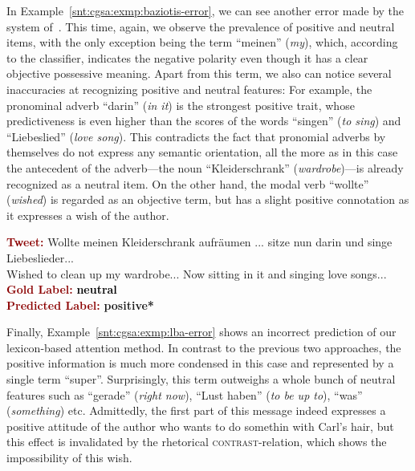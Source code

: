 In Example~\ref{snt:cgsa:exmp:baziotis-error}, we can see another
error made by the system of~\citet{Baziotis:17}.  This time, again, we
observe the prevalence of positive and neutral items, with the only
exception being the term ``meinen'' (\emph{my}), which, according to
the classifier, indicates the negative polarity even though it has a
clear objective possessive meaning.  Apart from this term, we also can
notice several inaccuracies at recognizing positive and neutral
features: For example, the pronominal adverb ``darin'' (\emph{in it})
is the strongest positive trait, whose predictiveness is even higher
than the scores of the words ``singen'' (\emph{to sing}) and
``Liebeslied'' (\emph{love song}).  This contradicts the fact that
pronomial adverbs by themselves do not express any semantic
orientation, all the more as in this case the antecedent of the
adverb---the noun ``Kleiderschrank'' (\emph{wardrobe})---is already
recognized as a neutral item.  On the other hand, the modal verb
``wollte'' (\emph{wished}) is regarded as an objective term, but has a
slight positive connotation as it expresses a wish of the author.

\begin{example}\label{snt:cgsa:exmp:baziotis-error}
  \noindent\textup{\bfseries\textcolor{darkred}{Tweet:}} {\upshape \colorbox{white!1.4}{Wollte} \colorbox{blue!7.7}{meinen} \colorbox{white!3.6}{Kleiderschrank} \colorbox{blue!1.7}{aufr\"aumen} ... \colorbox{white!1.2}{sitze} \colorbox{green!4.6}{nun} \colorbox{green!31.5}{darin} \colorbox{green!2.8}{und} \colorbox{green!29.7}{singe} \colorbox{green!15.2}{Liebeslieder}...}\\
  \noindent \colorbox{white!1.4}{Wished} to \colorbox{blue!1.7}{clean up} \colorbox{blue!7.7}{my} \colorbox{white!3.6}{wardrobe}... \colorbox{green!4.6}{Now} \colorbox{white!1.2}{sitting} \colorbox{green!31.5}{in it} \colorbox{green!2.8}{and} \colorbox{green!29.7}{singing} \colorbox{green!15.2}{love songs}...\\[\exampleSep]
  \noindent\textup{\bfseries\textcolor{darkred}{Gold Label:}}\hspace*{4.3em}\textbf{%
    \upshape\textcolor{black}{neutral}}\\
 \noindent\textup{\bfseries\textcolor{darkred}{Predicted Label:}}\hspace*{2em}\textbf{%
    \upshape\textcolor{green3}{positive*}}
\end{example}

Finally, Example~\ref{snt:cgsa:exmp:lba-error} shows an incorrect
prediction of our lexicon-based attention method.  In contrast to the
previous two approaches, the positive information is much more
condensed in this case and represented by a single term ``super''.
Surprisingly, this term outweighs a whole bunch of neutral features
such as ``gerade'' (\emph{right now}), ``Lust haben'' (\emph{to be up
  to}), ``was'' (\emph{something}) etc.  Admittedly, the first part of
this message indeed expresses a positive attitude of the author who
wants to do somethin with Carl's hair, but this effect is invalidated
by the rhetorical \textsc{contrast}-relation, which shows the
impossibility of this wish.

